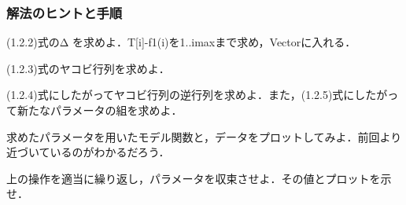 \documentclass{article}
\begin{document}
\subsubsection{\textbf{解法のヒントと手順}}
\begin{maplegroup}
\begin{Maple Normal}{
(1.2.2)式のΔ
を求めよ．T[i]-f1(i)を1..imaxまで求め，Vectorに入れる．}\end{Maple Normal}

\begin{Maple Normal}{
(1.2.3)式のヤコビ行列を求めよ．}\end{Maple Normal}

\begin{Maple Normal}{
(1.2.4)式にしたがってヤコビ行列の逆行列を求めよ．また，(1.2.5)式にしたがって新たなパラメータの組を求めよ．}\end{Maple Normal}

\begin{Maple Normal}{
求めたパラメータを用いたモデル関数と，データをプロットしてみよ．前回より近づいているのがわかるだろう．}\end{Maple Normal}

\begin{Maple Normal}{
上の操作を適当に繰り返し，パラメータを収束させよ．その値とプロットを示せ．}\end{Maple Normal}
\end{maplegroup}
\end{document}
